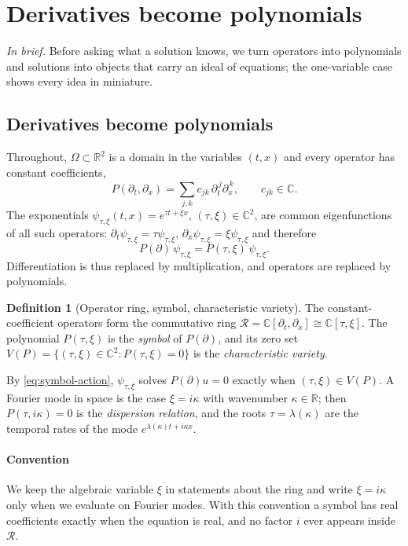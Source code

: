 \documentclass[11pt]{article}
\theoremstyle{plain}
\theoremstyle{definition}
\newtheorem{definition}[theorem]{Definition}
\theoremstyle{remark}
\newcommand{\R}{\mathbb{R}}
\newcommand{\C}{\mathbb{C}}
\newcommand{\ring}{\mathcal{R}}            %
\newcommand{\Var}{V}                        %
\newcommand{\inbrief}[1]{\par\smallskip\noindent\emph{In brief.} #1\par\smallskip}
\begin{document}
\section{Derivatives become polynomials}\label{sec:theory}\label{ch:prelim}\label{ch:algebra}
\inbrief{Before asking what a solution knows, we turn operators into polynomials and solutions into objects that carry an ideal of equations; the one-variable case shows every idea in miniature.}

\subsection{Derivatives become polynomials}\label{sec:ring}
Throughout, $\Omega\subset\R^2$ is a domain in the variables $(t,x)$ and every operator has constant
coefficients,
\[
  P(\partial_t,\partial_x)=\sum_{j,k}c_{jk}\,\partial_t^{\,j}\partial_x^{\,k},\qquad c_{jk}\in\C .
\]
The exponentials $\psi_{\tau,\xi}(t,x)=e^{\tau t+\xi x}$, $(\tau,\xi)\in\C^2$, are common eigenfunctions of
all such operators: $\partial_t \psi_{\tau,\xi}=\tau \psi_{\tau,\xi}$, $\partial_x \psi_{\tau,\xi}=\xi \psi_{\tau,\xi}$ and
therefore
\begin{equation}\label{eq:symbol-action}
  P(\partial)\,\psi_{\tau,\xi}=P(\tau,\xi)\,\psi_{\tau,\xi}.
\end{equation}
Differentiation is thus replaced by multiplication, and operators are replaced by polynomials.

\begin{definition}[Operator ring, symbol, characteristic variety]\label{def:ring}
The constant-coefficient operators form the commutative ring
$\ring=\C[\partial_t,\partial_x]\cong\C[\tau,\xi]$. The polynomial $P(\tau,\xi)$ is the \emph{symbol} of
$P(\partial)$, and its zero set $\Var(P)=\{(\tau,\xi)\in\C^2:P(\tau,\xi)=0\}$ is the
\emph{characteristic variety}.
\end{definition}

By \eqref{eq:symbol-action}, $\psi_{\tau,\xi}$ solves $P(\partial)u=0$ exactly when $(\tau,\xi)\in\Var(P)$.
A Fourier mode in space is the case $\xi=i\kappa$ with wavenumber $\kappa\in\R$; then
$P(\tau,i\kappa)=0$ is the \emph{dispersion relation}, and the roots $\tau=\lambda(\kappa)$ are the
temporal rates of the mode $e^{\lambda(\kappa)t+i\kappa x}$.

\paragraph{Convention}
We keep the algebraic variable $\xi$ in statements about the ring and write $\xi=i\kappa$ only when we
evaluate on Fourier modes. With this convention a symbol has real coefficients exactly when the
equation is real, and no factor $i$ ever appears inside $\ring$.
\end{document}
